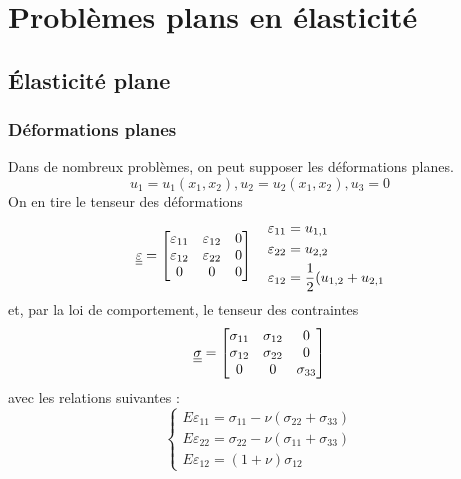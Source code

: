 \chapter{Problèmes plans en élasticité}\label{chap:Ch08}
\section{Élasticité plane}\label{sec:Ch08-1}
\subsection{Déformations planes}\label{ssec:Ch08-1.1}
Dans de nombreux problèmes, on peut supposer les déformations planes.
\begin{equation}
    u_1=u_1(x_1,x_2), u_2=u_2(x_1,x_2), u_3=0
    \label{eq:Ch08-001}
\end{equation}
On en tire le tenseur des déformations 
\begin{equation}
    \underline{\underline{\varepsilon}}=
    \begin{bmatrix}
        \varepsilon_{11} & \varepsilon_{12} & 0 \\
        \varepsilon_{12} & \varepsilon_{22} & 0 \\
        0                & 0                & 0 \\     
    \end{bmatrix}
    \quad
    \begin{aligned}
         \varepsilon_{11}&= u_{1,1} \\
         \varepsilon_{22}&= u_{2,2} \\
         \varepsilon_{12}&= \frac{1}{2}(u_{1,2}+u_{2,1} 
    \end{aligned}
\label{eq:Ch08-002}
\end{equation}
et, par la loi de comportement, le tenseur des contraintes
\begin{equation}
    \underline{\underline{\sigma}} =
    \begin{bmatrix}
        \sigma_{11} & \sigma_{12} & 0           \\
        \sigma_{12} & \sigma_{22} & 0           \\
        0           & 0           & \sigma_{33} \\     
    \end{bmatrix}
\label{eq:Ch08-003}
\end{equation}
avec les relations suivantes :
\begin{equation}
   \begin{cases}
     E\varepsilon_{11} = \sigma_{11}-\nu(\sigma_{22}+\sigma_{33}) \\
     E\varepsilon_{22} = \sigma_{22}-\nu(\sigma_{11}+\sigma_{33}) \\
     E\varepsilon_{12} = (1+\nu)\sigma_{12}
   \end{cases}
    \label{eq:Ch08-004}
\end{equation}
